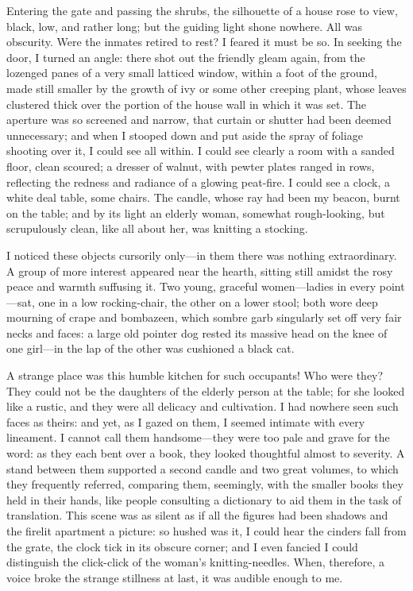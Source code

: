 Entering the gate and passing the shrubs, the silhouette of a house rose
to view, black, low, and rather long; but the guiding light shone
nowhere. All was obscurity. Were the inmates retired to rest? I
feared it must be so. In seeking the door, I turned an angle: there
shot out the friendly gleam again, from the lozenged panes of a very
small latticed window, within a foot of the ground, made still smaller
by the growth of ivy or some other creeping plant, whose leaves
clustered thick over the portion of the house wall in which it was set.
The aperture was so screened and narrow, that curtain or shutter had
been deemed unnecessary; and when I stooped down and put aside the spray
of foliage shooting over it, I could see all within. I could see
clearly a room with a sanded floor, clean scoured; a dresser of walnut,
with pewter plates ranged in rows, reflecting the redness and radiance
of a glowing peat-fire. I could see a clock, a white deal table, some
chairs. The candle, whose ray had been my beacon, burnt on the table;
and by its light an elderly woman, somewhat rough-looking, but
scrupulously clean, like all about her, was knitting a stocking.

I noticed these objects cursorily only---in them there was nothing
extraordinary. A group of more interest appeared near the hearth,
sitting still amidst the rosy peace and warmth suffusing it. Two young,
graceful women---ladies in every point---sat, one in a low
rocking-chair, the other on a lower stool; both wore deep mourning of
crape and bombazeen, which sombre garb singularly set off very fair
necks and faces: a large old pointer dog rested its massive head on the
knee of one girl---in the lap of the other was cushioned a black cat.

A strange place was this humble kitchen for such occupants! Who were
they? They could not be the daughters of the elderly person at the
table; for she looked like a rustic, and they were all delicacy and
cultivation. I had nowhere seen such faces as theirs: and yet, as I
gazed on them, I seemed intimate with every lineament. I cannot call
them handsome---they were too pale and grave for the word: as they each
bent over a book, they looked thoughtful almost to severity. A stand
between them supported a second candle and two great volumes, to which
they frequently referred, comparing them, seemingly, with the smaller
books they held in their hands, like people consulting a dictionary to
aid them in the task of translation. This scene was as silent as if all
the figures had been shadows and the firelit apartment a picture: so
hushed was it, I could hear the cinders fall from the grate, the clock
tick in its obscure corner; and I even fancied I could distinguish the
click-click of the woman's knitting-needles. When, therefore, a voice
broke the strange stillness at last, it was audible enough to me.


